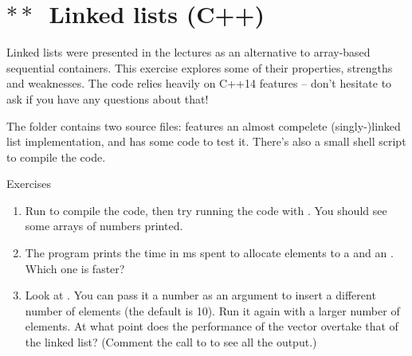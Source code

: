 \section{$\ast\ast$~Linked lists (C++)}

Linked lists were presented in the lectures as an alternative to array-based sequential containers. This exercise explores some of their properties, strengths and weaknesses. The code relies heavily on \mbox{C++14} features -- don't hesitate to ask if you have any questions about that!

The folder  contains two source files:  features an almost compelete (singly-)linked list implementation, and  has some code to test it. There's also a small shell script to compile the code.
%
\begin{mybox}{Exercises}
    \begin{enumerate}
        \item Run  to compile the code, then try running the code with . You should see some arrays of numbers printed.
        \item The program prints the time in ms spent to allocate elements to a  and an . Which one is faster?
        \item Look at . You can pass it a number as an argument to insert a different number of elements (the default is 10). Run it again with a larger number of elements. At what point does the performance of the vector overtake that of the linked list? (Comment the call to  to see all the output.)
    \end{enumerate}
\end{mybox}

